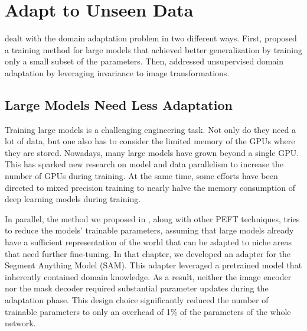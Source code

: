 
\section{Adapt to Unseen Data}\label{sec:disc_adapt}
 dealt with the domain adaptation problem in two different ways. First,  proposed a training method for large models that achieved better generalization by training only a small subset of the parameters. Then,  addressed unsupervised domain adaptation by leveraging invariance to image transformations.

\subsection{Large Models Need Less Adaptation}
Training large models is a challenging engineering task. Not only do they need a lot of data, but one also has to consider the limited memory of the GPUs where they are stored. Nowadays, many large models have grown beyond a single GPU. This has sparked new research on model and data parallelism to increase the number of GPUs during training. At the same time, some efforts have been directed to mixed precision training to nearly halve the memory consumption of deep learning models during training.

In parallel, the method we proposed in , along with other PEFT techniques, tries to reduce the models' trainable parameters, assuming that large models already have a sufficient representation of the world that can be adapted to niche areas that need further fine-tuning. In that chapter, we developed an adapter for the Segment Anything Model (SAM). This adapter leveraged a pretrained model that inherently contained domain knowledge. As a result, neither the image encoder nor the mask decoder required substantial parameter updates during the adaptation phase. This design choice significantly reduced the number of trainable parameters to only an overhead of 1\% of the parameters of the whole network.

